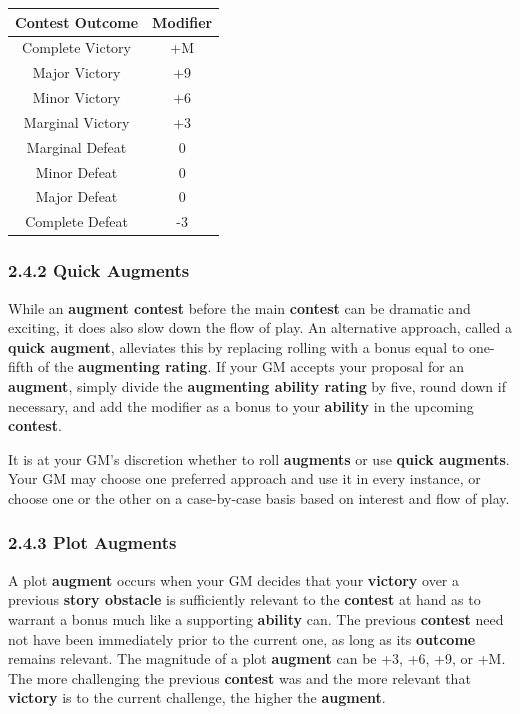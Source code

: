 \documentclass[
]{article}
\begin{document}
\begin{longtable}[]{@{}cc@{}}
\toprule
Contest Outcome & Modifier\tabularnewline
\midrule
\endhead
Complete Victory & +M\tabularnewline
Major Victory & +9\tabularnewline
Minor Victory & +6\tabularnewline
Marginal Victory & +3\tabularnewline
Marginal Defeat & 0\tabularnewline
Minor Defeat & 0\tabularnewline
Major Defeat & 0\tabularnewline
Complete Defeat & -3\tabularnewline
\bottomrule
\end{longtable}

\hypertarget{quick-augments}{%
\subsubsection{2.4.2 Quick Augments}\label{quick-augments}}

While an \textbf{augment contest} before the main \textbf{contest} can
be dramatic and exciting, it does also slow down the flow of play. An
alternative approach, called a \textbf{quick augment}, alleviates this
by replacing rolling with a bonus equal to one-fifth of the
\textbf{augmenting rating}. If your GM accepts your proposal for an
\textbf{augment}, simply divide the \textbf{augmenting ability rating}
by five, round down if necessary, and add the modifier as a bonus to
your \textbf{ability} in the upcoming \textbf{contest}.

It is at your GM's discretion whether to roll \textbf{augments} or use
\textbf{quick augments}. Your GM may choose one preferred approach and
use it in every instance, or choose one or the other on a case-by-case
basis based on interest and flow of play.

\hypertarget{plot-augments}{%
\subsubsection{2.4.3 Plot Augments}\label{plot-augments}}

A plot \textbf{augment} occurs when your GM decides that your
\textbf{victory} over a previous \textbf{story obstacle} is sufficiently
relevant to the \textbf{contest} at hand as to warrant a bonus much like
a supporting \textbf{ability} can. The previous \textbf{contest} need
not have been immediately prior to the current one, as long as its
\textbf{outcome} remains relevant. The magnitude of a plot
\textbf{augment} can be +3, +6, +9, or +M. The more challenging the
previous \textbf{contest} was and the more relevant that
\textbf{victory} is to the current challenge, the higher the
\textbf{augment}.
\end{document}
